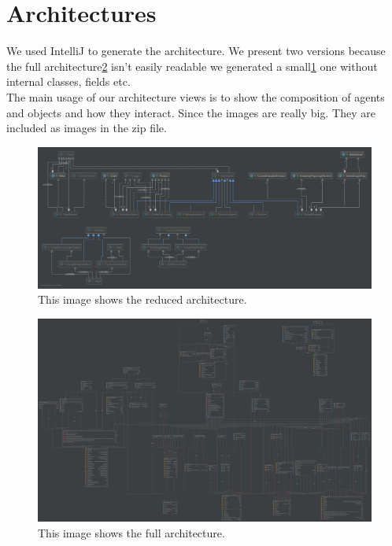 \documentclass[10pt,a4paper]{article}
\begin{document}
	\section{Architectures}
	We used IntelliJ to generate the architecture. We present two versions because the full architecture\ref{fig:arch_full} isn't easily readable we generated a small\ref{fig:arch_small} one without internal classes, fields etc.
	\\
	The main usage of our architecture views is to show the composition of agents and objects and how they interact. Since the images are really big. They are included as images in the zip file.
	\newpage
	\recalctypearea
	\begin{figure}[hbt!]
		\hspace*{-6cm}
		\centering
		\includegraphics[width=0.9\paperwidth]{Architecture_small.png}
		\caption{This image shows the reduced architecture.}
		\label{fig:arch_small}
	\end{figure}
	\newpage
	\begin{figure}[hbt!]
		\hspace*{-6cm}
		\centering
		\includegraphics[width=0.9\paperwidth]{Architecture_full.png}
		\caption{This image shows the full architecture.}
		\label{fig:arch_full}
		
	\end{figure}
\end{document}
